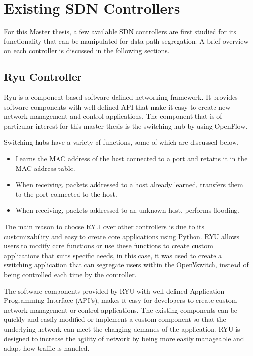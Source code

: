 \section{Existing SDN Controllers}\label{existing_sdn_controllers}
For this Master thesis, a few available SDN controllers are first studied for its functionality that can be manipulated for data path segregation. A brief overview on each controller is discussed in the following sections.
\subsection{Ryu Controller \cite{RYU_Switching_Hub}}\label{ryu_controller}
Ryu is a component-based software defined networking framework. It provides software components with well-defined API that make it easy to create new network management and control applications. The component that is of particular interest for this master thesis is the switching hub by using OpenFlow.

Switching hubs have a variety of functions, some of which are discussed below.
\begin{itemize}
	\item Learns the MAC address of the host connected to a port and retains it in the MAC address table.
	\item When receiving, packets addressed to a host already learned, transfers them to the port connected to the host.
	\item When receiving, packets addressed to an unknown host, performs flooding.
\end{itemize}

The main reason to choose RYU over other controllers is due to its customizability and easy to create core applications using Python. RYU allows users to modify core functions or use these functions to create custom applications that suits specific needs, in this case, it was used to create a switching application that can segregate users within the OpenVswitch, instead of being controlled each time by the controller.

The software components provided by RYU with well-defined Application Programming Interface (API’s), makes it easy for developers to create custom network management or control applications. The existing components can be quickly and easily modified or implement a custom component so that the underlying network can meet the changing demands of the application. RYU is designed to increase the agility of network by being more easily manageable and adapt how traffic is handled.

